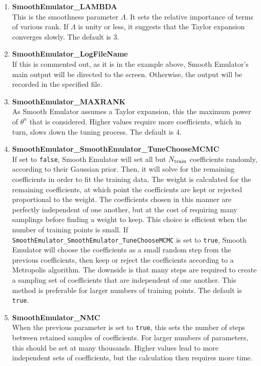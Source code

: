 \documentclass[main.tex]{subfiles}
\begin{document}
\begin{enumerate}\itemsep 0pt
\item {\bf SmoothEmulator\_LAMBDA}\\
This is the smoothness parameter $\Lambda$. It sets the relative importance of terms of various rank. If $\Lambda$ is unity or less, it suggests that the Taylor expansion converges slowly. The default is 3.

\item {\bf SmoothEmulator\_LogFileName}\\
If this is commented out, as it is in the example above, Smooth Emulator's main output will be directed to the screen. Otherwise, the output will be recorded in the specified file.
\item {\bf SmoothEmulator\_MAXRANK}\\
As Smooth Emulator assumes a Taylor expansion, this the maximum power of $\theta^n$ that is considered. Higher values require more coefficients, which in turn, slows down the tuning process. The default is 4.
\item {\bf SmoothEmulator\_SmoothEmulator\_TuneChooseMCMC}\\
If set to {\tt false}, Smooth Emulator will set all but $N_{\rm train}$ coefficients randomly, according to their Gaussian prior. Then, it will solve for the remaining coefficients in order to fit the training data. The weight is calculated for the remaining coefficients, at which point the coefficients are kept or rejected proportional to the weight. The coefficients chosen in this manner are perfectly independent of one another, but at the cost of requiring many samplings before finding a weight to keep. This choice is efficient when the number of training points is small. If {\tt SmoothEmulator\_SmoothEmulator\_TuneChooseMCMC} is set to {\tt true}, Smooth Emulator will choose the coefficients as a small random step from the previous coefficients, then keep or reject the coefficients according to a Metropolis algorithm. The downside is that many steps are required to create a sampling set of coefficients that are independent of one another. This method is preferable for larger numbers of training points.  The default is {\tt true}.
\item {\bf SmoothEmulator\_NMC}\\
When the previous parameter is set to {\tt true}, this sets the number of steps between retained samples of coefficients. For larger numbers of parameters, this should be set at many thousands. Higher values lead to more independent sets of coefficients, but the calculation then requires more time. 

\end{enumerate}
\end{document}
